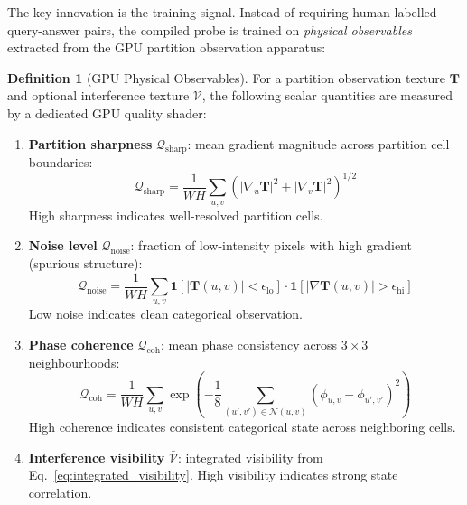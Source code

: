 \documentclass[11pt,twocolumn,a4paper]{article}
\theoremstyle{definition}
\newtheorem{definition}[theorem]{Definition}
\theoremstyle{remark}
\begin{document}
The key innovation is the training signal. Instead of requiring human-labelled query-answer pairs, the compiled probe is trained on \emph{physical observables} extracted from the GPU partition observation apparatus:

\begin{definition}[GPU Physical Observables]
\label{def:gpu_observables}
For a partition observation texture $\mathbf{T}$ and optional interference texture $\mathcal{V}$, the following scalar quantities are measured by a dedicated GPU quality shader:
\begin{enumerate}[nosep]
\item \textbf{Partition sharpness} $\mathcal{Q}_{\mathrm{sharp}}$: mean gradient magnitude across partition cell boundaries:
\begin{equation}
\mathcal{Q}_{\mathrm{sharp}} = \frac{1}{WH} \sum_{u,v} \left( |\nabla_u \mathbf{T}|^2 + |\nabla_v \mathbf{T}|^2 \right)^{1/2}
\label{eq:sharpness}
\end{equation}
High sharpness indicates well-resolved partition cells.

\item \textbf{Noise level} $\mathcal{Q}_{\mathrm{noise}}$: fraction of low-intensity pixels with high gradient (spurious structure):
\begin{equation}
\mathcal{Q}_{\mathrm{noise}} = \frac{1}{WH} \sum_{u,v} \mathbf{1}[|\mathbf{T}(u,v)| < \epsilon_{\mathrm{lo}}] \cdot \mathbf{1}[|\nabla \mathbf{T}(u,v)| > \epsilon_{\mathrm{hi}}]
\label{eq:noise}
\end{equation}
Low noise indicates clean categorical observation.

\item \textbf{Phase coherence} $\mathcal{Q}_{\mathrm{coh}}$: mean phase consistency across $3 \times 3$ neighbourhoods:
\begin{equation}
\mathcal{Q}_{\mathrm{coh}} = \frac{1}{WH} \sum_{u,v} \exp\!\left(- \frac{1}{8}\sum_{(u',v') \in \mathcal{N}(u,v)} (\phi_{u,v} - \phi_{u',v'})^2 \right)
\label{eq:coherence}
\end{equation}
High coherence indicates consistent categorical state across neighboring cells.

\item \textbf{Interference visibility} $\bar{\mathcal{V}}$: integrated visibility from Eq.~\eqref{eq:integrated_visibility}. High visibility indicates strong state correlation.
\end{enumerate}
\end{definition}
\end{document}
